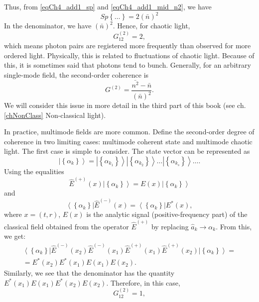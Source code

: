 Thus, from \eqref{eqCh4_add1_sp} and \eqref{eqCh4_add1_mid_n2}, we have
\[
Sp\left\{\dots\right\} = 2\left(\bar{n}\right)^2
\] 
In the denominator, we have $\left(\bar{n}\right)^2$. Hence, for chaotic light,
\begin{equation}
G_{12}^{(2)} = 2,
\label{eqCh4_27}
\end{equation}
which means photon pairs are registered more frequently than observed for more ordered light. Physically, this is related to fluctuations of chaotic light. Because of this, it is sometimes said that photons tend to bunch. Generally, for an arbitrary single-mode field, the second-order coherence is
\begin{equation}
G^{(2)} = \frac{\bar{n^2} - \bar{n}}{\left(\bar{n}\right)^2}.
\label{eqCh4_28}
\end{equation}
We will consider this issue in more detail in the third part of this book (see ch. \ref{chNonClass} Non-classical light).

In practice, multimode fields are more common. Define the second-order degree of coherence in two limiting cases: multimode coherent state and multimode chaotic light. The first case is simple to consider. The state vector can be represented as  
\begin{equation}
\left|\left\{\alpha_k\right\}\right> = 
\left|\left\{\alpha_{k_1}\right\}\right>
\left|\left\{\alpha_{k_2}\right\}\right>
\dotsc
\left|\left\{\alpha_{k_s}\right\}\right>
\dots.
\label{eqCh4_29}
\end{equation}
Using the equalities 
\[
\hat{E}^{(+)}\left(x\right)\left|\left\{\alpha_k\right\}\right> = 
E\left(x\right)\left|\left\{\alpha_k\right\}\right>
\]
and
\[
\left<\left\{\alpha_k\right\}\right|\hat{E}^{(-)}\left(x\right) = 
\left<\left\{\alpha_k\right\}\right|E^{*}\left(x\right),
\]
where $x = \left(t, r\right)$, $E\left(x\right)$ is the analytic signal (positive-frequency part) of the classical field obtained from the operator $\hat{E}^{(+)}$ by replacing $\hat{a}_k \rightarrow \alpha_k$. From this, we get:
\begin{eqnarray}
\left<\left\{\alpha_k\right\}\right|\hat{E}^{(-)}\left(x_2\right)
\hat{E}^{(-)}\left(x_1\right)\hat{E}^{(+)}\left(x_1\right)
\hat{E}^{(+)}\left(x_2\right)\left|\left\{\alpha_k\right\}\right> = 
\nonumber \\
= E^{*}\left(x_2\right)E^{*}\left(x_1\right)
E\left(x_1\right)E\left(x_2\right).
\nonumber
\end{eqnarray}
Similarly, we see that the denominator has the quantity  
$E^{*}\left(x_1\right)E\left(x_1\right)
E^{*}\left(x_2\right)
E\left(x_2\right)$. Therefore, in this case,
\begin{equation}
G_{12}^{(2)} = 1,
\label{eqCh4_30}
\end{equation}


